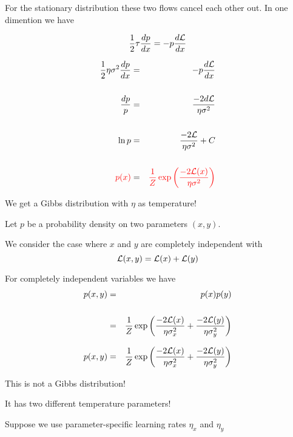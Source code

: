 {\vfill
For the stationary distribution these two flows cancel each other out.
In one dimention we have

\vfill
$$\frac{1}{2} \tau \frac{dp}{dx} = - p\frac{d{\cal L}}{dx}$$



\vspace{-2ex}
\begin{eqnarray*}
\frac{1}{2} \eta \sigma^2 \frac{dp}{dx} & = & - p\frac{d{\cal L}}{dx} \\
\\
\frac{dp}{p} & = & \frac{-2d{\cal L}}{\eta\sigma^2} \\
\\
\ln p & = & \frac{-2{\cal L}}{\eta \sigma^2} + C \\
\\
{\color{red} p(x)} & = & {\color{red} \frac{1}{Z}\exp\left(\frac{-2{\cal L}(x)}{\eta \sigma^2}\right)}
\end{eqnarray*}

\vfill
We get a Gibbs distribution with $\eta$ as temperature!


Let $p$ be a probability density on two parameters $(x,y)$.

\vfill
We consider the case where $x$ and $y$ are completely independent with
$${\cal L}(x,y) = {\cal L}(x) + {\cal L}(y)$$

\vfill
For completely independent variables we have
\begin{eqnarray*}
p(x,y) & = & p(x)p(y) \\
\\
&= & \frac{1}{Z} \exp\left(\frac{-2{\cal L}(x)}{ \eta \sigma_x^2} + \frac{-2{\cal L}(y)}{\eta \sigma_y^2}\right)
\end{eqnarray*}


\begin{eqnarray*}
p(x,y) & = & \frac{1}{Z} \exp\left(\frac{-2{\cal L}(x)}{ \eta \sigma_x^2} + \frac{-2{\cal L}(y)}{\eta \sigma_y^2}\right)
\end{eqnarray*}

\vfill
This is not a Gibbs distribution!

\vfill
It has two different temperature parameters!


Suppose we use parameter-specific learning rates $\eta_x$ and $\eta_y$

}
